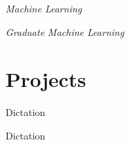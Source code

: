 \documentclass[margin,line]{resume}
\begin{document}
\begin{resume}
        \textsl{Machine Learning} \par\vspace{-4mm}%
    {\addtolength{\leftskip}{2 mm}       
    \par}
   
       \textsl{Graduate Machine Learning} \par\vspace{-1mm}%
    {\addtolength{\leftskip}{2 mm}       
    \par}



    \section{\mysidestyle{} Projects}

\begin{list}{∙}{}

  \item Dictation
  \item Dictation

\end{list}




\end{resume}
\end{document}
